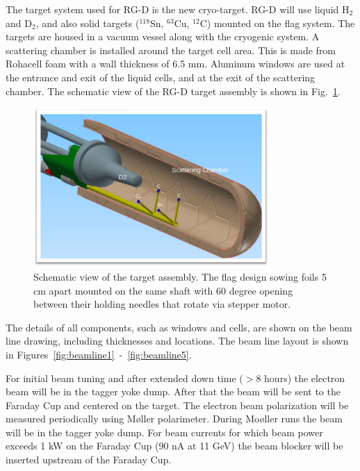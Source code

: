\documentclass[11pt]{article}
\begin{document}
The target system used for RG-D is the new cryo-target.  RG-D will use liquid H$_2$ and D$_2$, and also solid targets ($^{118}$Sn, $^{63}$Cu, $^{12}$C) mounted on the flag system. The targets are housed in a vacuum vessel along with the cryogenic system.  A scattering chamber is installed around the target cell area.  This is made from Rohacell foam with a wall thickness of 6.5 mm.  Aluminum windows are used at the entrance and exit of the liquid cells, and at the exit of the scattering chamber. The schematic view of the RG-D target assembly is shown in Fig.~\ref{fig:RGDT}. 

\begin{figure}[htb!]
\centering
\includegraphics[width=0.8\textwidth]{RGDtarget.png}
\caption{Schematic view of the target assembly.
The flag design sowing foils 5 cm apart mounted on the same shaft with 60 degree opening between their holding needles that rotate via stepper motor.}
\label{fig:RGDT}
\end{figure}


The details of all components, such as windows and cells, are shown on the beam line drawing, including thicknesses and locations.  The beam line layout is shown in Figures~\ref{fig:beamline1}~-~\ref{fig:beamline5}.



For initial beam tuning and after extended down time ($>$8 hours) the electron beam will be  in the tagger yoke dump. After that the beam will be sent to the Faraday Cup and centered on the target.  The electron beam polarization will be measured periodically using M{\o}ller polarimeter. During Mo{\o}ller runs the beam will be in the tagger yoke dump. For beam currents for which beam power exceeds 1 kW on the Faraday Cup (90 nA at 11 GeV) the beam blocker will be inserted upstream of the Faraday Cup.

\end{document}
